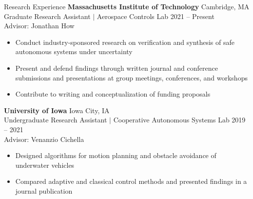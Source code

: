 \begin{rSection}{Research Experience}
{\bf Massachusetts Institute of Technology} \hfill Cambridge, MA \\ 
Graduate Research Assistant $|$ Aerospace Controls Lab \hfill 2021 -- Present \\
Advisor: Jonathan How
\begin{itemize}
    \item Conduct industry-sponsored research on verification and synthesis of safe autonomous systems under uncertainty
    \item Present and defend findings through written journal and conference submissions and presentations at group meetings, conferences, and workshops 
    \item Contribute to writing and conceptualization of funding proposals
\end{itemize}

{\bf University of Iowa} \hfill Iowa City, IA \\ 
Undergraduate Research Assistant $|$ Cooperative Autonomous Systems Lab \hfill 2019 -- 2021 \\
Advisor: Venanzio Cichella
\begin{itemize}
    \item Designed algorithms for motion planning and obstacle avoidance of underwater vehicles
    \item Compared adaptive and classical control methods and presented findings in a journal publication
\end{itemize}

\end{rSection}